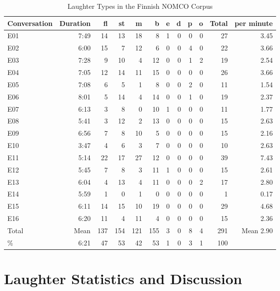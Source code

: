 \documentclass[10pt,journal,compsoc]{IEEEtran}
\begin{document}
\begin{table}[!t]
\caption{Laughter Types in the Finnish NOMCO Corpus}
\label{tab:laughter-finnish}
\centering
\begin{tabular}{| l | r | r r | r r r r r r | r | r |}
\hline
Conversation & Duration & fl  & st & m & b & e & d & p & o & Total & per minute \\
\hline
E01 & 7:49 & 14 & 13 & 18 & 8 & 1 & 0 & 0 & 0 & 27 & 3.45 \\
E02 & 6:00 & 15 & 7 & 12 & 6 & 0 & 0 & 4 & 0 & 22 & 3.66 \\
E03 & 7:28 & 9 & 10 & 4 & 12 & 0 & 0 & 1 & 2 & 19 & 2.54 \\
E04 & 7:05 & 12 & 14 & 11 & 15 & 0 & 0 & 0 & 0 & 26 & 3.66 \\
E05 & 7:08 & 6 & 5 & 1 & 8 & 0 & 0 & 2 & 0 & 11 & 1.54 \\
E06 & 8:01 & 5 & 14 & 4 & 14 & 0 & 0 & 1 & 0 & 19 & 2.37 \\
E07 & 6:13 & 3 & 8 & 0 & 10 & 1 & 0 & 0 & 0 & 11 & 1.77 \\
E08 & 5:41 & 3 & 12 & 2 & 13 & 0 & 0 & 0 & 0 & 15 & 2.63 \\
E09 & 6:56 & 7 & 8 & 10 & 5 & 0 & 0 & 0 & 0 & 15 & 2.16 \\
E10 & 3:47 & 4 & 6 & 3 & 7 & 0 & 0 & 0 & 0 & 10 & 2.63 \\
E11 & 5:14 & 22 & 17 & 27 & 12 & 0 & 0 & 0 & 0 & 39 & 7.43 \\
E12 & 5:45 & 7 & 8 & 3 & 11 & 1 & 0 & 0 & 0 & 15 & 2.61 \\
E13 & 6:04 & 4 & 13 & 4 & 11 & 0 & 0 & 0 & 2 & 17 & 2.80 \\
E14 & 5:59 & 1 & 0 & 1 & 0 & 0 & 0 & 0 & 0 & 1 & 0.17 \\
E15 & 6:11 & 14 & 15 & 10 & 19 & 0 & 0 & 0 & 0 & 29 & 4.68 \\
E16 & 6:20 & 11 & 4 & 11 & 4 & 0 & 0 & 0 & 0 & 15 & 2.36 \\
\hline
Total  & Mean  & 137 & 154 & 121 & 155 & 3 & 0 & 8 & 4 & 291 & Mean 2.90 \\
\%     & 6:21 &  47 &  53 &  42 &  53 & 1 & 0 & 3 & 1 & 100 & \\
\hline
\end{tabular}
\end{table}

\section{Laughter Statistics and Discussion}
\label{sec:statistics}
\end{document}
